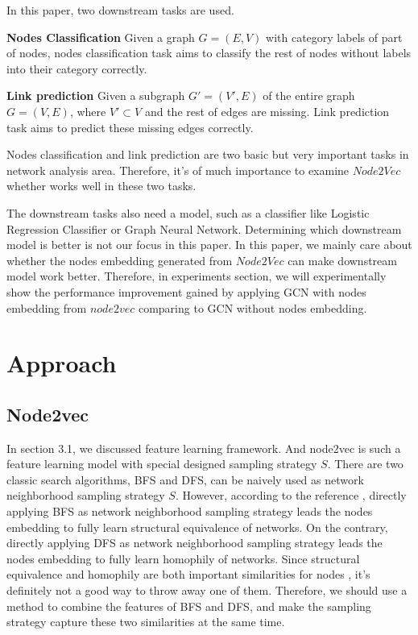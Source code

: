 \documentclass[sigconf]{acmart}
\begin{document}
In this paper, two downstream tasks are used.

\textbf{Nodes Classification} Given a graph $G=(E,V)$ with category labels of part of nodes, nodes classification task aims to classify the rest of nodes without labels into their category correctly.

\textbf{Link prediction} Given a subgraph $G'=(V',E)$ of the entire graph $G=(V,E)$, where $V'\subset V$ and the rest of edges are missing. Link prediction task aims to predict these missing edges correctly.

Nodes classification and link prediction are two basic but very important tasks in network analysis area. Therefore, it's of much importance to examine $Node2Vec$ whether works well in these two tasks.

The downstream tasks also need a model, such as a classifier like Logistic Regression Classifier or Graph Neural Network. Determining which downstream model is better is not our focus in this paper. In this paper, we mainly care about whether the nodes embedding generated from $Node2Vec$ can make downstream model work better. Therefore, in experiments section, we will experimentally show the performance improvement gained by applying GCN with nodes embedding from $node2vec$ comparing to GCN without nodes embedding.


\section{Approach}

\subsection{Node2vec}

In section 3.1, we discussed feature learning framework. And node2vec is such a feature learning model with special designed sampling strategy $S$. There are two classic search algorithms, BFS and DFS, can be naively used as network neighborhood sampling strategy $S$. However, according to the reference \cite{node2vec}, directly applying BFS as network neighborhood sampling strategy leads the nodes embedding to fully learn structural equivalence of networks. On the contrary, directly applying DFS as network neighborhood sampling strategy leads the nodes embedding to fully learn homophily of networks. Since structural equivalence and homophily are both important similarities for nodes \cite{mikolov2013distributed}, it's definitely not a good way to throw away one of them. Therefore, we should use a method to combine the features of BFS and DFS, and make the sampling strategy capture these two similarities at the same time.
\end{document}
